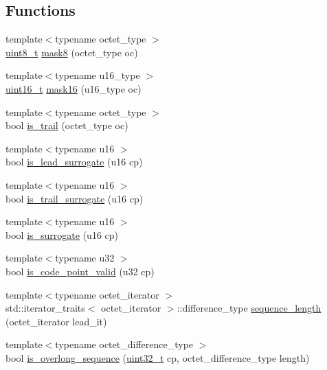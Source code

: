 \subsection*{Functions}
\begin{DoxyCompactItemize}
\item 
{\footnotesize template$<$typename octet\+\_\+type $>$ }\\\hyperlink{namespaceutf8_abe793b552fabe390d134b97ab81d2c7f}{uint8\+\_\+t} \hyperlink{namespaceutf8_1_1internal_adf6e0469e279b9562aa461b4c3c1e7e4}{mask8} (octet\+\_\+type oc)
\item 
{\footnotesize template$<$typename u16\+\_\+type $>$ }\\\hyperlink{namespaceutf8_ac23066b92c5a1d9d9ef177201f750936}{uint16\+\_\+t} \hyperlink{namespaceutf8_1_1internal_ab1e3c2fe2296ac185993a183d1bd0678}{mask16} (u16\+\_\+type oc)
\item 
{\footnotesize template$<$typename octet\+\_\+type $>$ }\\bool \hyperlink{namespaceutf8_1_1internal_ab4820484159ba613b4901476ceb24516}{is\+\_\+trail} (octet\+\_\+type oc)
\item 
{\footnotesize template$<$typename u16 $>$ }\\bool \hyperlink{namespaceutf8_1_1internal_a1a4095fb207096e04f94f21eb23d2723}{is\+\_\+lead\+\_\+surrogate} (u16 cp)
\item 
{\footnotesize template$<$typename u16 $>$ }\\bool \hyperlink{namespaceutf8_1_1internal_a295b2873fce985213937e5f1193fcb13}{is\+\_\+trail\+\_\+surrogate} (u16 cp)
\item 
{\footnotesize template$<$typename u16 $>$ }\\bool \hyperlink{namespaceutf8_1_1internal_a31a185a6bc8b9bf454191a8a95a93595}{is\+\_\+surrogate} (u16 cp)
\item 
{\footnotesize template$<$typename u32 $>$ }\\bool \hyperlink{namespaceutf8_1_1internal_a97b553137aaeda6e8ca6f8d46f78fd79}{is\+\_\+code\+\_\+point\+\_\+valid} (u32 cp)
\item 
{\footnotesize template$<$typename octet\+\_\+iterator $>$ }\\std\+::iterator\+\_\+traits$<$ octet\+\_\+iterator $>$\+::difference\+\_\+type \hyperlink{namespaceutf8_1_1internal_aadbe437cba7bfcc4df2638f633e9787c}{sequence\+\_\+length} (octet\+\_\+iterator lead\+\_\+it)
\item 
{\footnotesize template$<$typename octet\+\_\+difference\+\_\+type $>$ }\\bool \hyperlink{namespaceutf8_1_1internal_a3160f6f24dff465f64f83cb0e66995c6}{is\+\_\+overlong\+\_\+sequence} (\hyperlink{namespaceutf8_a846259d2f173d524282583fc9d825b00}{uint32\+\_\+t} cp, octet\+\_\+difference\+\_\+type length)

\end{DoxyCompactItemize}
